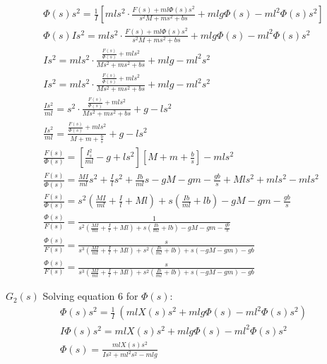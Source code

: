 \begin{eqnarray}
	\Phi\left(s\right)s^2=\frac{1}{I}\left[mls^2\cdot\frac{F\left(s\right)+ml\Phi\left(s\right)s^2}{s^2M+ms^2+bs}+mlg\Phi\left(s\right)-ml^2\Phi\left(s\right)s^2\right] \\
	\Phi\left(s\right)Is^2=mls^2\cdot\frac{F\left(s\right)+ml\Phi\left(s\right)s^2}{s^2M+ms^2+bs}+mlg\Phi\left(s\right)-ml^2\Phi\left(s\right)s^2 
	\\
	Is^2=mls^2\cdot\frac{\frac{F\left(s\right)}{\Phi\left(s\right)}+mls^2}{Ms^2+ms^2+bs}+mlg-ml^2s^2 \\
	Is^2=mls^2\cdot\frac{\frac{F\left(s\right)}{\Phi\left(s\right)}+mls^2}{Ms^2+ms^2+bs}+mlg-ml^2s^2 \\
	\frac{Is^2}{ml}=s^2\cdot\frac{\frac{F\left(s\right)}{\Phi\left(s\right)}+mls^2}{Ms^2+ms^2+bs}+g-ls^2 \\
	\frac{Is^2}{ml}=\frac{\frac{F\left(s\right)}{\Phi\left(s\right)}+mls^2}{M+m+\frac{b}{s}}+g-ls^2 \\
	\frac{F\left(s\right)}{\Phi\left(s\right)}=\left[\frac{I_s^2}{ml}-g+ls^2\right]\left[M+m+\frac{b}{s}\right]-mls^2 \\
	\frac{F\left(s\right)}{\Phi\left(s\right)}=\frac{MI}{ml}s^2+\frac{I}{l}s^2+\frac{Ib}{ml}s-gM-gm-\frac{gb}{s}+Mls^2+mls^2-mls^2 \\
	\frac{F\left(s\right)}{\Phi\left(s\right)}=s^2\left(\frac{MI}{ml}+\frac{I}{l}+Ml\right)+s\left(\frac{Ib}{ml}+lb\right)-gM-gm-\frac{gb}{s} \\
	\frac{\Phi\left(s\right)}{F\left(s\right)}=\frac{1}{s^2\left(\frac{MI}{ml}+\frac{I}{l}+Ml\right)+s\left(\frac{Ib}{ml}+lb\right)-gM-gm-\frac{gb}{s}} \\
	\frac{\Phi\left(s\right)}{F\left(s\right)}=\frac{s}{s^3\left(\frac{MI}{ml}+\frac{I}{l}+Ml\right)+s^2\left(\frac{Ib}{ml}+lb\right)+s(-gM-gm)-gb} 
	\\
	\frac{\Phi\left(s\right)}{F\left(s\right)}=\frac{s}{s^3\left(\frac{MI}{ml}+\frac{I}{l}+Ml\right)+s^2\left(\frac{Ib}{ml}+lb\right)+s\left(-gM-gm\right)-gb}
\end{eqnarray}


\textbf{$G_2(s)$}
Solving equation 6 for $\Phi(s)$:
\begin{eqnarray}
	\Phi\left(s\right)s^2=\frac{1}{I}\ \left(mlX\left(s\right)s^2+mlg\Phi\left(s\right)-ml^2\Phi\left(s\right)s^2\right)
	\\
	I\Phi\left(s\right)s^2=mlX\left(s\right)s^2+mlg\Phi\left(s\right)-ml^2\Phi\left(s\right)s^2
	\\
	\Phi\left(s\right)=\frac{mlX\left(s\right)s^2}{Is^2+ml^2s^2-mlg}
\end{eqnarray}

